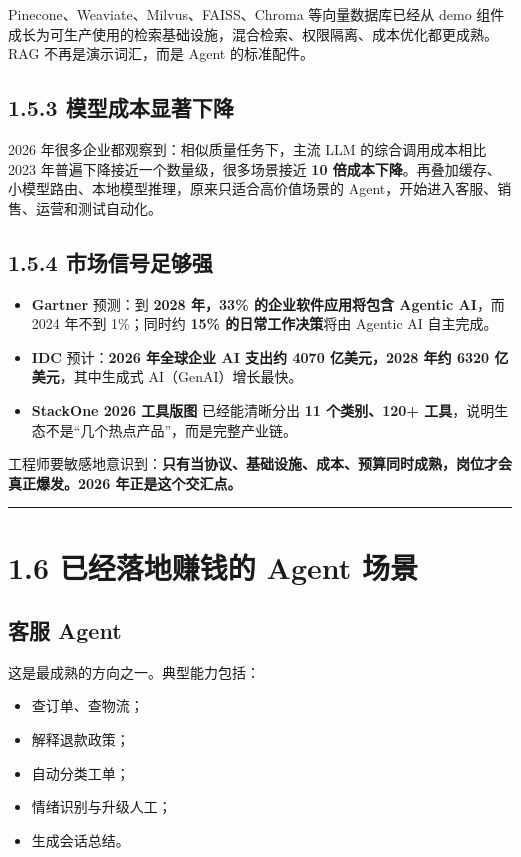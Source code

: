 Pinecone、Weaviate、Milvus、FAISS、Chroma 等向量数据库已经从 demo 组件成长为可生产使用的检索基础设施，混合检索、权限隔离、成本优化都更成熟。RAG 不再是演示词汇，而是 Agent 的标准配件。


\subsection{1.5.3 模型成本显著下降}

2026 年很多企业都观察到：相似质量任务下，主流 LLM 的综合调用成本相比 2023 年普遍下降接近一个数量级，很多场景接近 \textbf{10 倍成本下降}。再叠加缓存、小模型路由、本地模型推理，原来只适合高价值场景的 Agent，开始进入客服、销售、运营和测试自动化。


\subsection{1.5.4 市场信号足够强}

\begin{itemize}[leftmargin=2em]
\item \textbf{Gartner} 预测：到 \textbf{2028 年，33\% 的企业软件应用将包含 Agentic AI}，而 2024 年不到 1\%；同时约 \textbf{15\% 的日常工作决策}将由 Agentic AI 自主完成。
\item \textbf{IDC} 预计：\textbf{2026 年全球企业 AI 支出约 4070 亿美元，2028 年约 6320 亿美元}，其中生成式 AI（GenAI）增长最快。
\item \textbf{StackOne 2026 工具版图} 已经能清晰分出 \textbf{11 个类别、120+ 工具}，说明生态不是``几个热点产品''，而是完整产业链。
\end{itemize}

工程师要敏感地意识到：\textbf{只有当协议、基础设施、成本、预算同时成熟，岗位才会真正爆发。2026 年正是这个交汇点。}


\bigskip\hrule\bigskip

\section{1.6 已经落地赚钱的 Agent 场景}

\subsection{客服 Agent}

这是最成熟的方向之一。典型能力包括：


\begin{itemize}[leftmargin=2em]
\item 查订单、查物流；
\item 解释退款政策；
\item 自动分类工单；
\item 情绪识别与升级人工；
\item 生成会话总结。
\end{itemize}


